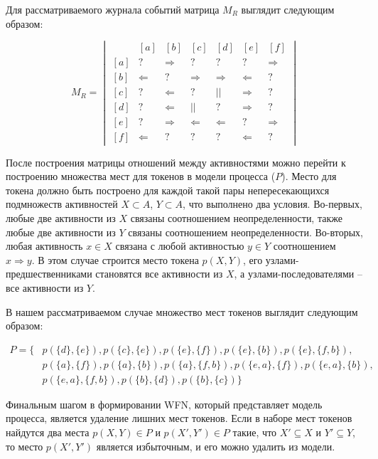 \documentclass[
11pt,%
tightenlines,%
twoside,%
onecolumn,%
nofloats,%
nobibnotes,%
nofootinbib,%
superscriptaddress,%
noshowpacs,%
centertags]%
{revtex4}
\begin{document}
Для рассматриваемого журнала событий матрица $M_R$ выглядит следующим образом:

\begin{equation}\label{eqn:r}
M_R = \begin{vmatrix}
\ & [a] & [b] & [c] & [d] & [e] & [f] \\
[a] & ? & \Rightarrow & ? & ? & ? & \Rightarrow \\ 
[b] & \Leftarrow & ? & \Rightarrow & \Rightarrow & \Leftarrow & ? \\
[c] & ? & \Leftarrow & ? & || & \Rightarrow & ? \\
[d] & ? & \Leftarrow & || & ? & \Rightarrow & ? \\
[e] & ? & \Rightarrow & \Leftarrow & \Leftarrow & ? & \Rightarrow \\
[f] & \Leftarrow & ? & ? & ? & \Leftarrow & ?
\end{vmatrix}
\end{equation}

После построения матрицы отношений между активностями можно перейти к построению множества мест для токенов в модели процесса ($P$).
Место для токена должно быть построено для каждой такой пары непересекающихся подмножеств активностей $X \subset A$, $Y \subset A$, что выполнено два условия.
Во-первых, любые две активности из $X$ связаны соотношением неопределенности, также любые две активности из $Y$ связаны соотношением неопределенности.
Во-вторых, любая активность $x \in X$ связана с любой активностью $y \in Y$ соотношением $x \Rightarrow y$. 
В этом случае строится место токена $p(X, Y)$, его узлами-предшественниками становятся все активности из $X$, а узлами-последователями -- все активности из $Y$.

В нашем рассматриваемом случае множество мест токенов выглядит следующим образом:

\begin{equation}
\begin{aligned}
P = \{
& p(\{d\}, \{e\}),
p(\{c\}, \{e\}),
p(\{e\}, \{f\}),
p(\{e\}, \{b\}),
p(\{e\}, \{f, b\}), \\
& p(\{a\}, \{f\}),
p(\{a\}, \{b\}),
p(\{a\}, \{f, b\}),
p(\{e, a\}, \{f\}),
p(\{e, a\}, \{b\}), \\
& p(\{e, a\}, \{f, b\}),
p(\{b\}, \{d\}),
p(\{b\}, \{c\})
\}
\end{aligned}
\end{equation}

Финальным шагом в формировании WFN, который представляет модель процесса, является удаление лишних мест токенов.
Если в наборе мест токенов найдутся два места $p(X, Y) \in P$ и $p(X', Y') \in P$ такие, что $X' \subseteq X$ и $Y' \subseteq Y$, то место $p(X', Y')$ является избыточным, и его можно удалить из модели.
\end{document}

